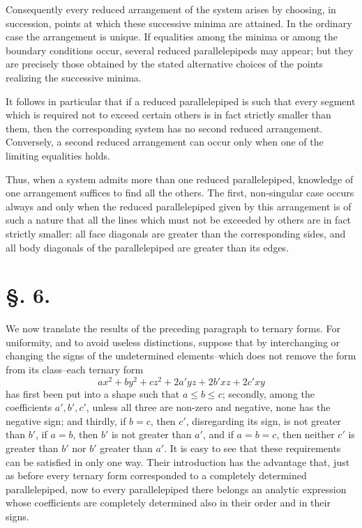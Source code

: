 \documentclass[11pt]{article}
\begin{document}
Consequently every reduced arrangement of the system arises by choosing, in succession, points at which these successive minima are attained. In the ordinary case the arrangement is unique. If equalities among the minima or among the boundary conditions occur, several reduced parallelepipeds may appear; but they are precisely those obtained by the stated alternative choices of the points realizing the successive minima.

It follows in particular that if a reduced parallelepiped is such that every segment which is required not to exceed certain others is in fact strictly smaller than them, then the corresponding system has no second reduced arrangement. Conversely, a second reduced arrangement can occur only when one of the limiting equalities holds.

Thus, when a system admits more than one reduced parallelepiped, knowledge of one arrangement suffices to find all the others. The first, non-singular case occurs always and only when the reduced parallelepiped given by this arrangement is of such a nature that all the lines which must not be exceeded by others are in fact strictly smaller: all face diagonals are greater than the corresponding sides, and all body diagonals of the parallelepiped are greater than its edges.

\section*{§. 6.}

We now translate the results of the preceding paragraph to ternary forms. For uniformity, and to avoid useless distinctions, suppose that by interchanging or changing the signs of the undetermined elements--which does not remove the form from its class--each ternary form
\begin{equation}
 ax^2+by^2+cz^2+2a'yz+2b'xz+2c'xy
\end{equation}
has first been put into a shape such that $a\le b\le c$; secondly, among the coefficients $a',b',c'$, unless all three are non-zero and negative, none has the negative sign; and thirdly, if $b=c$, then $c'$, disregarding its sign, is not greater than $b'$, if $a=b$, then $b'$ is not greater than $a'$, and if $a=b=c$, then neither $c'$ is greater than $b'$ nor $b'$ greater than $a'$. It is easy to see that these requirements can be satisfied in only one way. Their introduction has the advantage that, just as before every ternary form corresponded to a completely determined parallelepiped, now to every parallelepiped there belongs an analytic expression whose coefficients are completely determined also in their order and in their signs.
\end{document}
